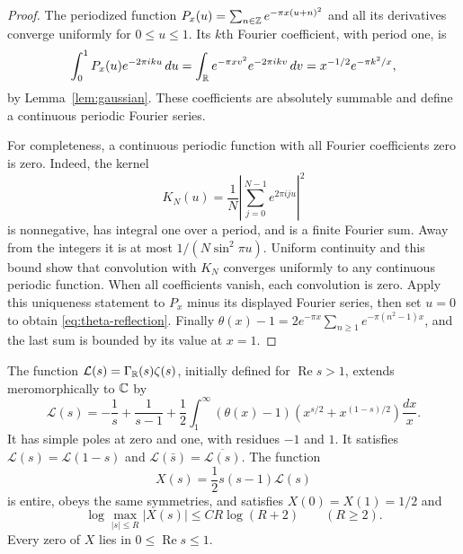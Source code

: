 \begin{proof}
The periodized function
$P_x(u)=\sum_{n\in\mathbb Z}e^{-\pi x(u+n)^2}$ and all its derivatives converge
uniformly for $0\leq u\leq1$.
Its $k$th Fourier coefficient, with period one, is
\[
 \int_0^1P_x(u)e^{-2\pi iku}\,du
 =\int_{\mathbb R}e^{-\pi xv^2}e^{-2\pi ikv}\,dv
 =x^{-1/2}e^{-\pi k^2/x},
\]
by Lemma~\ref{lem:gaussian}.
These coefficients are absolutely summable and define a continuous
periodic Fourier series.

For completeness, a continuous periodic function with all Fourier
coefficients zero is zero.  Indeed, the kernel
\[
 K_N(u)=\frac1N\left|\sum_{j=0}^{N-1}e^{2\pi iju}\right|^2
\]
is nonnegative, has integral one over a period, and is a finite Fourier sum.
Away from the integers it is at most $1/(N\sin^2\pi u)$.
Uniform continuity and this bound show that convolution with $K_N$ converges
uniformly to any continuous periodic function.
When all coefficients vanish, each convolution is zero.
Apply this uniqueness statement to $P_x$ minus its displayed Fourier series,
then set $u=0$ to obtain \eqref{eq:theta-reflection}.
Finally
$\theta(x)-1=2e^{-\pi x}\sum_{n\geq1}e^{-\pi(n^2-1)x}$,
and the last sum is bounded by its value at $x=1$.
\end{proof}

\begin{theorem}
\label{thm:completion}
The function $\mathcal L(s)=\Gamma_{\mathbb R}(s)\zeta(s)$, initially defined for
$\operatorname{Re}s>1$, extends meromorphically to $\mathbb C$ by
\begin{equation}
 \mathcal L(s)=-\frac1s+\frac1{s-1}
   +\frac12\int_1^\infty(\theta(x)-1)
                   \left(x^{s/2}+x^{(1-s)/2}\right)\frac{dx}{x}.
 \label{eq:theta-mellin}
\end{equation}
It has simple poles at zero and one, with residues $-1$ and $1$.
It satisfies $\mathcal L(s)=\mathcal L(1-s)$ and
$\mathcal L(\bar s)=\overline{\mathcal L(s)}$.
The function
\begin{equation}
 X(s)=\frac12 s(s-1)\mathcal L(s)
 \label{eq:entire-completion}
\end{equation}
is entire, obeys the same symmetries, and satisfies
$X(0)=X(1)=1/2$ and
\begin{equation}
 \log\max_{|s|\leq R}|X(s)|\leq C R\log(R+2)\qquad(R\geq2).
 \label{eq:entire-growth}
\end{equation}
Every zero of $X$ lies in $0\leq\operatorname{Re}s\leq1$.
\end{theorem}

